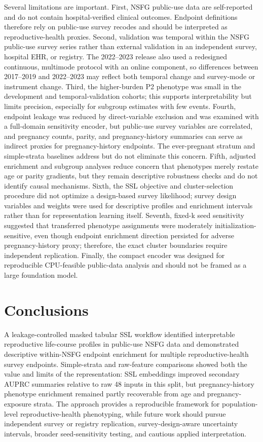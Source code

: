 \documentclass[referee,pdflatex,sn-basic,Numbered]{sn-jnl}
\begin{document}
Several limitations are important. First, NSFG public-use data are self-reported and do not contain hospital-verified clinical outcomes. Endpoint definitions therefore rely on public-use survey recodes and should be interpreted as reproductive-health proxies. Second, validation was temporal within the NSFG public-use survey series rather than external validation in an independent survey, hospital EHR, or registry. The 2022--2023 release also used a redesigned continuous, multimode protocol with an online component, so differences between 2017--2019 and 2022--2023 may reflect both temporal change and survey-mode or instrument change. Third, the higher-burden P2 phenotype was small in the development and temporal-validation cohorts; this supports interpretability but limits precision, especially for subgroup estimates with few events. Fourth, endpoint leakage was reduced by direct-variable exclusion and was examined with a full-domain sensitivity encoder, but public-use survey variables are correlated, and pregnancy counts, parity, and pregnancy-history summaries can serve as indirect proxies for pregnancy-history endpoints. The ever-pregnant stratum and simple-strata baselines address but do not eliminate this concern. Fifth, adjusted enrichment and subgroup analyses reduce concern that phenotypes merely restate age or parity gradients, but they remain descriptive robustness checks and do not identify causal mechanisms. Sixth, the SSL objective and cluster-selection procedure did not optimize a design-based survey likelihood; survey design variables and weights were used for descriptive profiles and enrichment intervals rather than for representation learning itself. Seventh, fixed-k seed sensitivity suggested that transferred phenotype assignments were moderately initialization-sensitive, even though endpoint enrichment direction persisted for adverse pregnancy-history proxy; therefore, the exact cluster boundaries require independent replication. Finally, the compact encoder was designed for reproducible CPU-feasible public-data analysis and should not be framed as a large foundation model.

\section{Conclusions}

A leakage-controlled masked tabular SSL workflow identified interpretable reproductive life-course profiles in public-use NSFG data and demonstrated descriptive within-NSFG endpoint enrichment for multiple reproductive-health survey endpoints. Simple-strata and raw-feature comparisons showed both the value and limits of the representation: SSL embeddings improved secondary AUPRC summaries relative to raw 48 inputs in this split, but pregnancy-history phenotype enrichment remained partly recoverable from age and pregnancy-exposure strata. The approach provides a reproducible framework for population-level reproductive-health phenotyping, while future work should pursue independent survey or registry replication, survey-design-aware uncertainty intervals, broader seed-sensitivity testing, and cautious applied interpretation.
\end{document}
